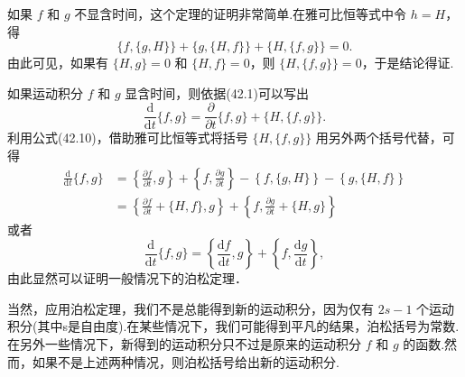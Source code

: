 如果 $f$ 和 $g$
不显含时间，这个定理的证明非常简单.在雅可比恒等式中令 $h=H$，得
\begin{equation*}
  \{f,\{g,H\}\}+\{g,\{H,f\}\}+\{H,\{f,g\}\}=0.
\end{equation*}
由此可见，如果有 $\{H,g\}=0$ 和 $\{H,f\}=0$，则 $\{H,\{f,g\}\}=0$，于是结论得证.

如果运动积分 $f$ 和 $g$ 显含时间，则依据(42.1)可以写出
\begin{equation*}
  \frac{\mathrm{d}}{\mathrm{d}t}\{f,g\}
  =\frac{\partial}{\partial t}\{f,g\}+\{H,\{f,g\}\}.
\end{equation*}
利用公式(42.10)，借助雅可比恒等式将括号 $\{H,\{f,g\}\}$
用另外两个括号代替，可得
\begin{equation*}
\begin{aligned}
  \frac{\mathrm{d}}{\mathrm{d}t}\{f,g\}
  &={}\left\{\frac{\partial f}{\partial t},g\right\}
  +\left\{f,\frac{\partial g}{\partial t}\right\}
  -\left\{f,\{g,H\}\right\}-\left\{g,\{H,f\}\right\}\\
  &={}\left\{\frac{\partial f}{\partial t}+\{H,f\},g\right\}
  +\left\{f,\frac{\partial g}{\partial t}+\{H,g\}\right\}
\end{aligned}
\end{equation*}
或者
\begin{equation}
  \frac{\mathrm{d}}{\mathrm{d}t}\{f,g\}
  =\left\{\frac{\mathrm{d}f}{\mathrm{d}t},g\right\}
  +\left\{f,\frac{\mathrm{d}g}{\mathrm{d}t}\right\},
\end{equation}
由此显然可以证明一般情况下的泊松定理．

当然，应用泊松定理，我们不是总能得到新的运动积分，因为仅有 $2s-1$
个运动积分(其中s是自由度).在某些情况下，我们可能得到平凡的结果，泊松括号为常数.在另外一些情况下，新得到的运动积分只不过是原来的运动积分
$f$ 和 $g$ 的函数.然而，如果不是上述两种情况，则泊松括号给出新的运动积分.

